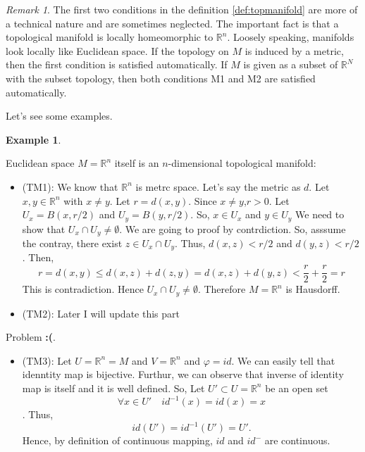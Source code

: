 \documentclass[
]{book}
\providecommand{\tightlist}{%
  \setlength{\itemsep}{0pt}\setlength{\parskip}{0pt}}
\theoremstyle{definition}
\theoremstyle{definition}
\newtheorem{example}{Example}[chapter]
\theoremstyle{definition}
\theoremstyle{definition}
\theoremstyle{remark}
\newtheorem*{remark}{Remark}
\begin{document}
\begin{remark}
The first two conditions in the definition \ref{def:topmanifold} are more of a technical nature and are sometimes neglected. The important fact is that a topological manifold is locally homeomorphic to \(\mathbb{R}^n\). Loosely speaking, manifolds look locally like Euclidean space. If the topology on \(M\) is induced by a metric, then the first condition is satisfied automatically. If \(M\) is given as a subset of \(\mathbb{R}^N\) with the subset topology, then both conditions M1 and M2 are satisfied automatically.
\end{remark}

Let's see some examples.

\begin{example}
\protect\hypertarget{exm:unnamed-chunk-8}{}\label{exm:unnamed-chunk-8}

Euclidean space \(M=\mathbb{R}^n\) itself is an \(n\)-dimensional topological manifold:

\begin{itemize}
\tightlist
\item
  (TM1): We know that \(\mathbb{R}^n\) is metrc space. Let's say the metric as \(d\). Let \(x,y\in \mathbb{R}^n\) with \(x\neq y\).
  Let \(r=d(x,y)\). Since \(x\neq y\),\(r>0\).
  Let \(U_x=B(x,r/2)\) and \(U_y=B(y,r/2)\).
  So, \(x\in U_x\) and \(y\in U_y\) We need to show that \(U_x \cap U_y\neq \emptyset\). We are going to proof by contrdiction. So, asssume the contray, there exist \(z\in U_x\cap U_y\). Thus,
  \(d(x,z)<r/2\) and \(d(y,z)<r/2\). Then,
  \[r=d(x,y)\leq d(x,z)+d(z,y)=d(x,z)+d(y,z)<\frac{r}{2}+\frac{r}{2}=r\]
  This is contradiction. Hence \(U_x\cap U_y \neq \emptyset\). Therefore \(M=\mathbb{R}^n\) is Hausdorff.
\item
  (TM2): Later I will update this part
\end{itemize}

{Problem \textbf{:(}}.

\begin{itemize}
\tightlist
\item
  (TM3): Let \(U=\mathbb{R}^n=M\) and \(V=\mathbb{R}^n\) and \(\varphi=id\). We can easily tell that idenntity map is bijective. Furthur, we can observe that inverse of identity map is itself and it is well defined.
  So, Let \(U'\subset U=\mathbb{R}^n\) be an open set
  \[\forall x\in U'\quad id^{-1}(x)=id(x)=x\]. Thus, \[id(U')=id^{-1}(U')=U'.\] Hence, by definition of continuous mapping, \(id\) and \(id^{-}\) are continuous.
\end{itemize}

\end{example}
\end{document}
